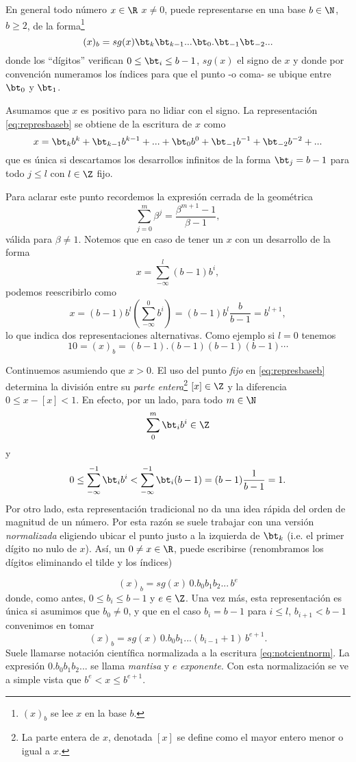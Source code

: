 En general todo número  $x\in \R$ $x\neq 0$, puede representarse en una base $b\in\N$, $b\ge 2$, de la forma\footnote{$(x)_b$ se lee $x$ en la base $b$.}
\begin{equation}
 \label{eq:represbaseb}
(x)_b=sg(x)\bt_k\bt_{k-1}...\bt_0.\bt_{-1}\bt_{-2}...
 \end{equation}
donde los ``dígitos'' verifican $0\le \bt_i\le b-1$, $sg(x)$ el signo de $x$ y donde por convención numeramos los índices para que el punto -o coma- se ubique entre $\bt_0$ y $\bt_1$.

Asumamos que $x$ es positivo para no lidiar con el signo. La representación \eqref{eq:represbaseb} se obtiene de la escritura de $x$ como
$$
x=\bt_kb^k+\bt_{k-1}b^{k-1}+...+\bt_0b^0+\bt_{-1}b^{-1}+\bt_{-2}b^{-2}+...
$$
 que es única si  descartamos los desarrollos infinitos de la forma $\bt_j=b-1$ para todo $j\le l$ con $l\in \Z$ fijo.

 Para aclarar este punto recordemos la expresión  cerrada de la geométrica
$$
\sum_{j=0}^m\beta^j=\frac{\beta^{m+1}-1}{\beta -1},
$$
 válida para $\beta\neq 1$. Notemos que  en caso de tener un $x$ con un desarrollo de la forma
$$
x=\sum_{-\infty}^l(b-1)b^i,
$$
podemos reescribirlo como
$$
x=(b-1)b^{l}
\left(\sum_{-\infty}^0b^i\right)=(b-1)b^l\frac{b}{b-1}=b^{l+1},
$$
lo que indica dos  representaciones alternativas. Como ejemplo si  $l=0$ tenemos
$$
10=(x)_b=(b-1).(b-1)(b-1)(b-1)\cdots
$$

Continuemos asumiendo que $x>0$. El uso del punto \emph{fijo} en  \eqref{eq:represbaseb}  determina la división entre su \emph{parte entera}\footnote{La parte entera de $x$, denotada $[x]$ se define como el mayor entero menor o igual a $x$.}  $[x]\in \Z$ y la diferencia $0\le x-[x]<1$. En efecto, por un lado, para todo $m\in \N$
$$\sum_{0}^m\bt_i b^i\in \Z$$
y
$$
0\le \sum_{-\infty}^{-1}\bt_ib^{i}<\sum_{-\infty}^{-1}\bt_i(b-1)=(b-1)\frac{1}{b-1}=1.
$$
Por otro lado, esta representación tradicional no da una idea rápida del orden de magnitud
de un número. Por esta razón se suele trabajar con una versión \emph{normalizada}  eligiendo ubicar el punto justo a la izquierda de $\bt_k$ (i.e. el primer dígito no nulo de $x$). Así, un $0\neq x\in \R$, puede escribirse (renombramos los dígitos eliminando el tilde y los índices)

\begin{equation}
 \label{eq:notcientnorm}
(x)_b=sg(x) \, 0.b_0b_1b_2...\, b^{e}
\end{equation}
donde, como antes, $0\le b_i\le b-1$ y $e\in \Z$.
Una vez más, esta representación es única si asumimos que $b_0\neq 0$, y que en el caso $b_i=b-1$ para $i\le l$, $b_{i+1}<b-1$
convenimos en tomar
$$
(x)_b=sg(x)\, 0.b_0b_1...(b_{i-1}+1)\, b^{e+1}.
$$
Suele llamarse notación científica normalizada a la escritura \eqref{eq:notcientnorm}. La expresión  $0.b_0b_1b_2...$ se llama \emph{mantisa} y $e$  \emph{exponente}. Con esta normalización se ve a simple vista que $b^e< x\le b^{e+1}$.

